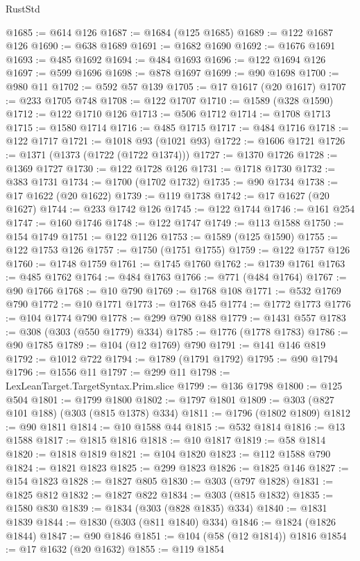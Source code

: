 \begin{lexlean}{RustStd}
\begin{coremodule}
@1685 := @614 @126
@1687 := @1684 (@125 @1685)
@1689 := @122 @1687 @126
@1690 := @638 @1689
@1691 := @1682 @1690
@1692 := @1676 @1691
@1693 := @485 @1692
@1694 := @484 @1693
@1696 := @122 @1694 @126
@1697 := @599 @1696
@1698 := @878 @1697
@1699 := @90 @1698
@1700 := @980 @11
@1702 := @592 @57 @139
@1705 := @17 @1617 (@20 @1617)
@1707 := @233 @1705 @748
@1708 := @122 @1707
@1710 := @1589 (@328 @1590)
@1712 := @122 @1710 @126
@1713 := @506 @1712
@1714 := @1708 @1713
@1715 := @1580 @1714
@1716 := @485 @1715
@1717 := @484 @1716
@1718 := @122 @1717
@1721 := @1018 @93 (@1021 @93)
@1722 := @1606 @1721
@1726 := @1371 (@1373 (@1722 (@1722 @1374)))
@1727 := @1370 @1726
@1728 := @1369 @1727
@1730 := @122 @1728 @126
@1731 := @1718 @1730
@1732 := @383 @1731
@1734 := @1700 (@1702 @1732)
@1735 := @90 @1734
@1738 := @17 @1622 (@20 @1622)
@1739 := @119 @1738
@1742 := @17 @1627 (@20 @1627)
@1744 := @233 @1742 @126
@1745 := @122 @1744
@1746 := @161 @254
@1747 := @160 @1746
@1748 := @122 @1747
@1749 := @113 @1588
@1750 := @154 @1749
@1751 := @122 @1126
@1753 := @1589 (@125 @1590)
@1755 := @122 @1753 @126
@1757 := @1750 (@1751 @1755)
@1759 := @122 @1757 @126
@1760 := @1748 @1759
@1761 := @1745 @1760
@1762 := @1739 @1761
@1763 := @485 @1762
@1764 := @484 @1763
@1766 := @771 (@484 @1764)
@1767 := @90 @1766
@1768 := @10 @790
@1769 := @1768 @108
@1771 := @532 @1769 @790
@1772 := @10 @1771
@1773 := @1768 @45
@1774 := @1772 @1773
@1776 := @104 @1774 @790
@1778 := @299 @790 @188
@1779 := @1431 @557
@1783 := @308 (@303 (@550 @1779) @334)
@1785 := @1776 (@1778 @1783)
@1786 := @90 @1785
@1789 := @104 (@12 @1769) @790
@1791 := @141 @146 @819
@1792 := @1012 @722
@1794 := @1789 (@1791 @1792)
@1795 := @90 @1794
@1796 := @1556 @11
@1797 := @299 @11
@1798 := LexLeanTarget.TargetSyntax.Prim.slice
@1799 := @136 @1798
@1800 := @125 @504
@1801 := @1799 @1800
@1802 := @1797 @1801
@1809 := @303 (@827 @101 @188) (@303 (@815 @1378) @334)
@1811 := @1796 (@1802 @1809)
@1812 := @90 @1811
@1814 := @10 @1588 @44
@1815 := @532 @1814
@1816 := @13 @1588
@1817 := @1815 @1816
@1818 := @10 @1817
@1819 := @58 @1814
@1820 := @1818 @1819
@1821 := @104 @1820
@1823 := @112 @1588 @790
@1824 := @1821 @1823
@1825 := @299 @1823
@1826 := @1825 @146
@1827 := @154 @1823
@1828 := @1827 @805
@1830 := @303 (@797 @1828)
@1831 := @1825 @812
@1832 := @1827 @822
@1834 := @303 (@815 @1832)
@1835 := @1580 @830
@1839 := @1834 (@303 (@828 @1835) @334)
@1840 := @1831 @1839
@1844 := @1830 (@303 (@811 @1840) @334)
@1846 := @1824 (@1826 @1844)
@1847 := @90 @1846
@1851 := @104 (@58 (@12 @1814)) @1816
@1854 := @17 @1632 (@20 @1632)
@1855 := @119 @1854

\end{coremodule}
\end{lexlean}
